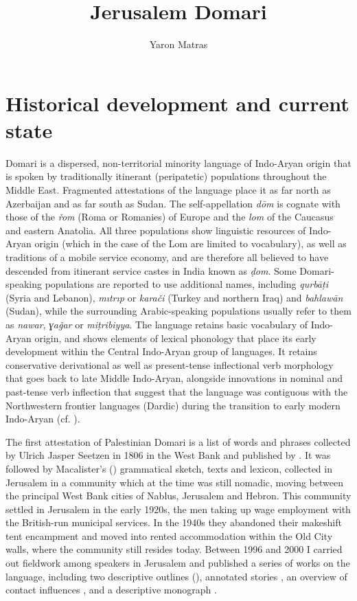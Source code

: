 \documentclass[output=paper]{langsci/langscibook}
\author{Yaron Matras\affiliation{University of Manchester}}
\title{Jerusalem Domari}
\begin{document}
 
\section{ Historical development and current state
}

Domari is a dispersed, non-territorial minority language of Indo-Aryan origin that is spoken by traditionally itinerant (peripatetic) populations throughout the Middle East. Fragmented attestations of the language place it as far north as Azerbaijan and as far south as Sudan. The self-appellation \textit{dōm} is cognate with those of the \textit{řom} (Roma or Romanies) of Europe and the \textit{lom} of the Caucasus and eastern Anatolia. All three populations show linguistic resources of Indo-Aryan origin (which in the case of the Lom are limited to vocabulary), as well as traditions of a mobile service economy, and are therefore all believed to have descended from itinerant service castes in India known as \textit{ḍom}. Some Domari-speaking populations are reported to use additional names, including \textit{qurbāṭi} (Syria and Lebanon), \textit{mıtrıp} or \textit{karači} (Turkey and northern Iraq) and \textit{bahlawān} (Sudan), while the surrounding Arabic-speaking populations usually refer to them as \textit{nawar}, \textit{ɣaǧar} or \textit{miṭribiyya}. The language retains basic vocabulary of Indo-Aryan origin, and shows elements of lexical phonology that place its early development within the Central Indo-Aryan group of languages. It retains conservative derivational as well as present-tense inflectional verb morphology that goes back to late Middle Indo-Aryan, alongside innovations in nominal and past-tense verb inflection that suggest that the language was contiguous with the Northwestern frontier languages (Dardic) during the transition to early modern Indo-Aryan (cf. \citealt{Matras2012}).

The first attestation of Palestinian Domari is a list of words and phrases collected by Ulrich Jasper Seetzen in 1806 in the West Bank and published by \citet{Kruse1854}. It was followed by Macalister's (\citeyear{Macalister1914}) grammatical sketch, texts and lexicon, collected in Jerusalem in a community which at the time was still nomadic, moving between the principal West Bank cities of Nablus, Jerusalem and Hebron. This community settled in Jerusalem in the early 1920s, the men taking up wage employment with the British-run municipal services. In the 1940s they abandoned their makeshift tent encampment and moved into rented accommodation within the Old City walls, where the community still resides today. Between 1996 and 2000 I carried out fieldwork among speakers in Jerusalem and published a series of works on the language, including two descriptive outlines (\citealt{Matras1999,Matras2011Domari}), annotated stories \citep{Matras2000}, an overview of contact influences \citep{Matras2007Domari}, and a descriptive monograph \citep{Matras2012}. 
\end{document}
